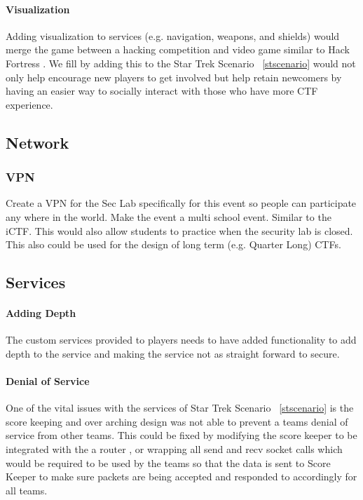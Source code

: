 \documentclass[10pt]{article}
\begin{document}
\paragraph*{Visualization}
Adding visualization to services (e.g. navigation, weapons, and shields) would merge the game
between a hacking competition and video game similar to Hack Fortress \cite{HackFortress}.
We fill by adding this to the Star Trek Scenario ~\ref{stscenario} would not only
help encourage new players to get involved but help retain newcomers by having
an easier way to socially interact with those who have more CTF experience.

\subsection{Network}

\subsubsection{VPN}
Create a VPN for the Sec Lab specifically for this event so people can participate any where
in the world. Make the event a multi school event. Similar to the iCTF. This
would also allow students to practice when the security lab is closed. This also could be used
for the design of long term (e.g. Quarter Long) CTFs.

\subsection{Services}

\paragraph*{Adding Depth}
The custom services provided to players needs to have added functionality to add depth
to the service and making the service not as straight forward to secure.

\paragraph*{Denial of Service}
One of the vital issues with the services of Star Trek Scenario ~\ref{stscenario} is the
score keeping and over arching design was not able to prevent a teams denial of service
from other teams. This could be fixed by modifying the score keeper to be integrated with
the a router \cite{BlackHat2004}, or wrapping all send and recv socket calls which
would be required to be used by the teams so that the data is sent to Score Keeper 
to make sure packets are being accepted and responded to accordingly for all teams.
\end{document}
